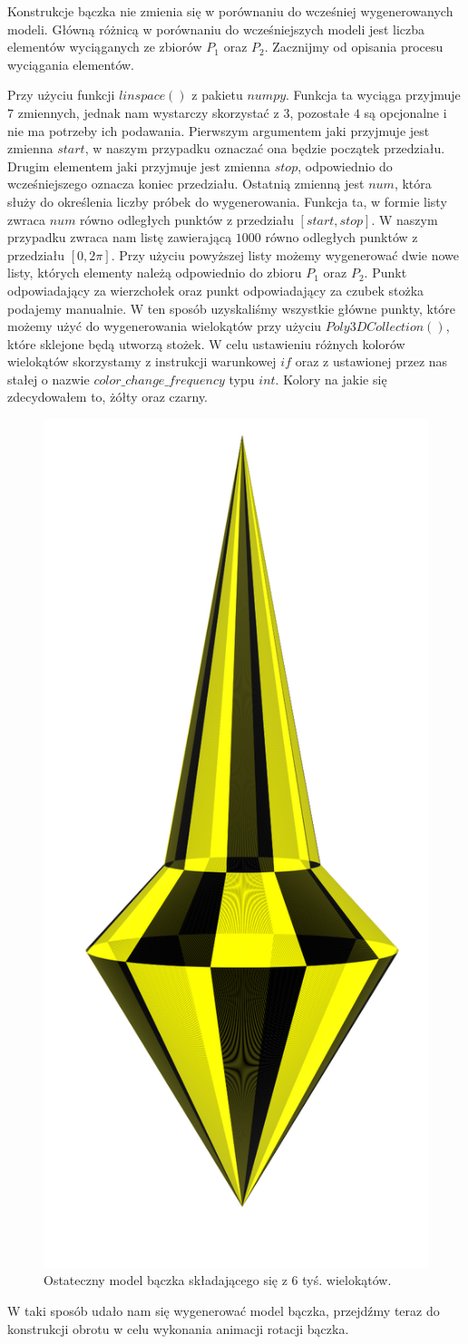 \documentclass[a4paper,twoside,11pt,reqno]{mwrep}
\theoremstyle{plain} \newtheorem{twr}{Twierdzenie}
\theoremstyle{plain} \newtheorem{lem}{Lemat}
\theoremstyle{definition} \newtheorem{defi}{Definicja}
\theoremstyle{remark} \newtheorem*{wni}{Wniosek}
\theoremstyle{definition} \newtheorem{uwaga}{Uwaga}
\theoremstyle{definition}\newtheorem{prz}{Przykład}
\begin{document}
Konstrukcje bączka nie zmienia się w porównaniu do wcześniej wygenerowanych modeli. 
Główną różnicą w porównaniu do wcześniejszych modeli jest liczba elementów wyciąganych ze zbiorów
$P_1$ oraz $P_2$. Zacznijmy od opisania procesu wyciągania elementów.

Przy użyciu funkcji $linspace()$ z pakietu $numpy$. Funkcja ta wyciąga przyjmuje $7$
zmiennych, jednak nam wystarczy skorzystać z $3$, pozostałe $4$ są opcjonalne i nie ma potrzeby ich podawania.
Pierwszym argumentem jaki przyjmuje jest zmienna $start$, w naszym przypadku oznaczać ona będzie początek przedziału. Drugim elementem jaki przyjmuje jest zmienna $stop$, odpowiednio do wcześniejszego 
oznacza koniec przedziału. Ostatnią zmienną jest $num$, która służy do określenia liczby próbek do wygenerowania.
Funkcja ta, w formie listy zwraca $num$ równo odległych punktów z przedziału $[start,stop]$.
W naszym przypadku zwraca nam listę zawierającą $1000$ równo odległych punktów z przedziału $[0,2\pi]$.
Przy użyciu powyższej listy możemy wygenerować dwie nowe listy, których elementy należą odpowiednio do 
zbioru $P_1$ oraz $P_2$. Punkt odpowiadający za wierzchołek oraz punkt odpowiadający
za czubek stożka podajemy manualnie. W ten sposób uzyskaliśmy wszystkie główne punkty, które możemy użyć do
wygenerowania wielokątów przy użyciu $Poly3DCollection()$, które sklejone będą utworzą stożek.
W celu ustawieniu różnych kolorów wielokątów skorzystamy z instrukcji warunkowej $if$ oraz z ustawionej przez
nas stałej o nazwie $color\_change\_frequency$ typu $int$. Kolory na jakie się zdecydowałem to, żółty oraz
czarny.     
\begin{figure}[h]
\begin{center}
\includegraphics[width=3 cm]{test0.png}
\caption{Ostateczny model bączka składającego się z $6$ tyś. wielokątów.}
\end{center}
\end{figure} 
W taki sposób udało nam się wygenerować model bączka, przejdźmy teraz do konstrukcji obrotu w celu wykonania animacji rotacji bączka.
\end{document}
